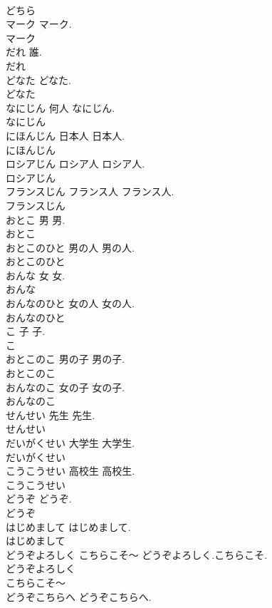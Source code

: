 \documentclass[8pt]{extreport}
\begin{document}
\begin{CJK}{UTF8}{min}
\\	どちら
\\	マーク		マーク.	
\\	マーク
\\	だれ		誰.	
\\	だれ
\\	どなた		どなた.	
\\	どなた
\\	なにじん	何人	なにじん.	
\\	なにじん
\\	にほんじん	日本人	日本人.	
\\	にほんじん
\\	ロシアじん	ロシア人	ロシア人.	
\\	ロシアじん
\\	フランスじん	フランス人	フランス人.	
\\	フランスじん
\\	おとこ	男	男.	
\\	おとこ
\\	おとこのひと	男の人	男の人.	
\\	おとこのひと
\\	おんな	女	女.	
\\	おんな
\\	おんなのひと	女の人	女の人.	
\\	おんなのひと
\\	こ	子	子.	
\\	こ
\\	おとこのこ	男の子	男の子.	
\\	おとこのこ
\\	おんなのこ	女の子	女の子.	
\\	おんなのこ
\\	せんせい	先生	先生.	
\\	せんせい
\\	だいがくせい	大学生	大学生.	
\\	だいがくせい
\\	こうこうせい	高校生	高校生.	
\\	こうこうせい
\\	どうぞ		どうぞ.	
\\	どうぞ
\\	はじめまして		はじめまして.	
\\	はじめまして
\\	どうぞよろしく こちらこそ～		どうぞよろしく.こちらこそ.	
\\	どうぞよろしく
\\	こちらこそ～
\\	どうぞこちらへ		どうぞこちらへ.	

\end{CJK}
\end{document}
